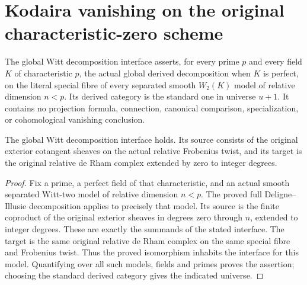 \section{Kodaira vanishing on the original characteristic-zero scheme}

\begin{definition}\label{def:kn-global-witt-di-input}
\leanok
The global Witt decomposition interface asserts, for every prime $p$ and every
field $K$ of characteristic $p$, the actual global derived decomposition
when $K$ is perfect, on the literal special fibre of every separated smooth $W_2(K)$ model of
relative dimension $n<p$.  Its derived category is the standard one in
universe $u+1$.  It contains
no projection formula, connection, canonical comparison, specialization,
or cohomological vanishing conclusion.
\end{definition}

\begin{lemma}
\label{lem:kn-proved-global-witt-di}
\leanok
The global Witt decomposition interface holds. Its source consists of the
original exterior cotangent sheaves on the actual relative Frobenius twist,
and its target is the original relative de Rham complex extended by zero
to integer degrees.
\end{lemma}
\begin{proof}
Fix a prime, a perfect field of that characteristic, and an actual smooth
separated Witt-two model of relative dimension $n<p$. The proved full
Deligne--Illusie decomposition applies to precisely that model. Its source
is the finite coproduct of the original exterior sheaves in degrees zero
through $n$, extended to integer degrees. These are exactly the summands
of the stated interface. The target is the same original relative de
Rham complex on the same special fibre and Frobenius twist. Thus the
proved isomorphism inhabits the interface for this model. Quantifying
over all such models, fields and primes proves the assertion; choosing
the standard derived category gives the indicated universe.
\end{proof}

